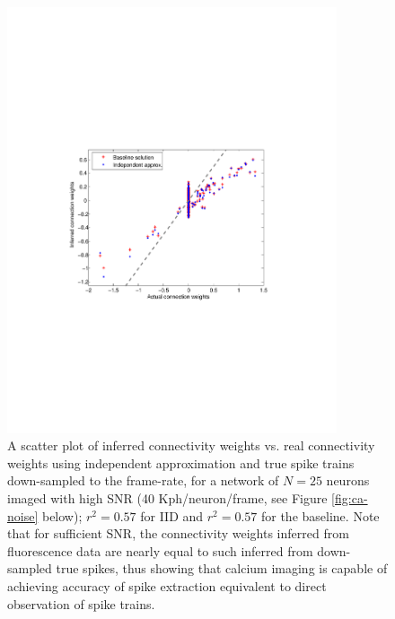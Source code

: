\begin{figure}
\includegraphics[width=275pt]{../figs/Figure2_fluor_base_vs_iid}
\caption{A scatter plot of inferred connectivity weights vs. real connectivity weights
using independent approximation and true spike trains down-sampled to the frame-rate, 
for a network of $N=25$ neurons imaged
with high SNR (40 Kph/neuron/frame, see Figure \ref{fig:ca-noise} below); $r^2=0.57$ for IID and $r^2=0.57$ for the baseline. Note that for sufficient SNR, the connectivity weights inferred from fluorescence data are nearly equal to such inferred from down-sampled true spikes, thus showing that calcium imaging is capable of achieving accuracy of spike extraction equivalent to direct observation of spike trains.}
\label{fig:iid-base}
\end{figure}

